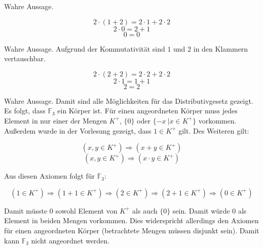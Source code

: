 \documentclass[11pt, a4paper]{article}
\begin{document}
		Wahre Aussage.

		\[ 2\cdot (1+2) = 2\cdot 1 + 2\cdot 2 \]
		\[ 2\cdot 0 = 2+1 \]
		\[ 0 = 0 \]

		Wahre Aussage. Aufgrund der Kommutativität sind $1$ und $2$ in den Klammern vertauschbar.

		\[ 2\cdot (2+2) = 2\cdot 2 + 2\cdot 2 \]
		\[ 2\cdot 1 = 1+1 \]
		\[ 2 = 2 \]

		Wahre Aussage. Damit sind alle Möglichkeiten für das Distributivgesetz gezeigt. Es folgt, dass $\mathbb{F}_3$ ein Körper ist.
		Für einen angeordneten Körper muss jedes Element in nur einer der Mengen $K^+$, $\{0\}$ oder $\{-x \ | x \in K^+ \}$ vorkommen.
		Außerdem wurde in der Vorlesung gezeigt, dass $1 \in K^+$ gilt. Des Weiteren gilt:

		\[ (x,y \in K^+) \Rightarrow (x+y \in K^+) \]
		\[ (x,y \in K^+) \Rightarrow (x\cdot y \in K^+) \]

		Aus diesen Axiomen folgt für $\mathbb{F}_3$:

		\[ (1\in K^+) \Rightarrow (1+1 \in K^+) \Rightarrow (2 \in K^+) \Rightarrow (2+1 \in K^+) \Rightarrow (0 \in K^+) \]

		Damit müsste $0$ sowohl Element von $K^+$ als auch $\{0\}$ sein. Damit würde $0$ als Element in beiden Mengen vorkommen. Dies widerspricht allerdings den Axiomen für einen angeordneten Körper (betrachtete Mengen müssen disjunkt sein). Damit kann $\mathbb{F}_3$ nicht angeordnet werden.
 
\end{document}

